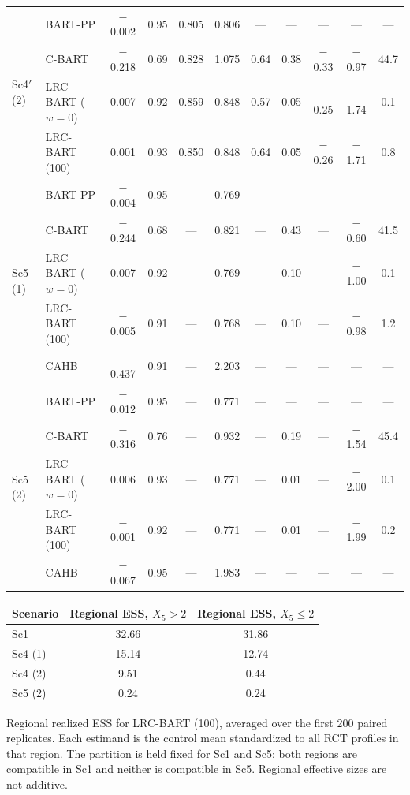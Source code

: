 \documentclass[11pt]{article}
\theoremstyle{definition}
\theoremstyle{plain}
\begin{document}
\begin{longtable}{llccccccccc}
\midrule
\multirow{4}{*}{Sc4$'$ (2)} & BART-PP & $-$0.002 & 0.95 & 0.805 & 0.806 & --- & --- & --- & --- & --- \\*
& C-BART & $-$0.218 & 0.69 & 0.828 & 1.075 & 0.64 & 0.38 & $-$0.33 & $-$0.97 & 44.7 \\*
& LRC-BART ($w=0$) & 0.007 & 0.92 & 0.859 & 0.848 & 0.57 & 0.05 & $-$0.25 & $-$1.74 & 0.1 \\*
& LRC-BART (100) & 0.001 & 0.93 & 0.850 & 0.848 & 0.64 & 0.05 & $-$0.26 & $-$1.71 & 0.8 \\
\midrule
\multirow{5}{*}{Sc5 (1)} & BART-PP & $-$0.004 & 0.95 & --- & 0.769 & --- & --- & --- & --- & --- \\*
& C-BART & $-$0.244 & 0.68 & --- & 0.821 & --- & 0.43 & --- & $-$0.60 & 41.5 \\*
& LRC-BART ($w=0$) & 0.007 & 0.92 & --- & 0.769 & --- & 0.10 & --- & $-$1.00 & 0.1 \\*
& LRC-BART (100) & $-$0.005 & 0.91 & --- & 0.768 & --- & 0.10 & --- & $-$0.98 & 1.2 \\*
& CAHB & $-$0.437 & 0.91 & --- & 2.203 & --- & --- & --- & --- & --- \\
\midrule
\multirow{5}{*}{Sc5 (2)} & BART-PP & $-$0.012 & 0.95 & --- & 0.771 & --- & --- & --- & --- & --- \\*
& C-BART & $-$0.316 & 0.76 & --- & 0.932 & --- & 0.19 & --- & $-$1.54 & 45.4 \\*
& LRC-BART ($w=0$) & 0.006 & 0.93 & --- & 0.771 & --- & 0.01 & --- & $-$2.00 & 0.1 \\*
& LRC-BART (100) & $-$0.001 & 0.92 & --- & 0.771 & --- & 0.01 & --- & $-$1.99 & 0.2 \\*
& CAHB & $-$0.067 & 0.95 & --- & 1.983 & --- & --- & --- & --- & --- \\
\end{longtable}
\endgroup
\begin{center}\scriptsize
\par\medskip
\begin{tabular}{lcc}
\toprule
Scenario & Regional ESS, $X_5>2$ & Regional ESS, $X_5\le2$ \\
\midrule
Sc1 & 32.66 & 31.86 \\
Sc4 (1) & 15.14 & 12.74 \\
Sc4 (2) & 9.51 & 0.44 \\
Sc5 (2) & 0.24 & 0.24 \\
\bottomrule
\end{tabular}
\par\smallskip\parbox{\textwidth}{\scriptsize Regional realized ESS for LRC-BART (100), averaged over the first 200 paired replicates. Each estimand is the control mean standardized to all RCT profiles in that region. The partition is held fixed for Sc1 and Sc5; both regions are compatible in Sc1 and neither is compatible in Sc5. Regional effective sizes are not additive.}
\end{center}
\end{document}
